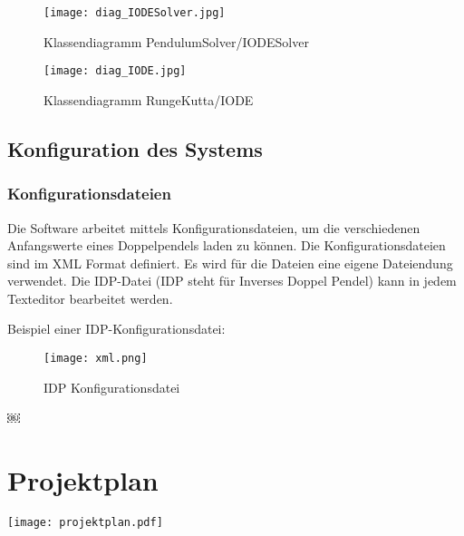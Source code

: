 \documentclass[12pt]{article}
\numberwithin{equation}{subsection}
\begin{document}
\begin{figure}[H]
	\centering
	\texttt{[image: diag\_IODESolver.jpg]}
	\caption{Klassendiagramm PendulumSolver/IODESolver}
	\label{fig:xml}
\end{figure}

\begin{figure}[H]
	\centering
	\texttt{[image: diag\_IODE.jpg]}
	\caption{Klassendiagramm RungeKutta/IODE}
	\label{fig:xml}
\end{figure}

\subsection{Konfiguration des Systems}
\subsubsection{Konfigurationsdateien}
Die Software arbeitet mittels Konfigurationsdateien, um die verschiedenen Anfangswerte eines Doppelpendels laden zu können. Die Konfigurationsdateien sind im XML Format definiert. Es wird für die Dateien eine eigene Dateiendung verwendet. Die IDP-Datei (IDP steht für Inverses Doppel Pendel) kann in jedem Texteditor bearbeitet werden.

Beispiel einer IDP-Konfigurationsdatei:
\begin{figure}[H]
	\centering
	\texttt{[image: xml.png]}
	\caption{IDP Konfigurationsdatei}
	\label{fig:xml}
\end{figure}

\newpage
￼\listoffigures

\newpage
\nocite{*}



\appendix
\section{Projektplan}
\texttt{[image: projektplan.pdf]}
\end{document}
